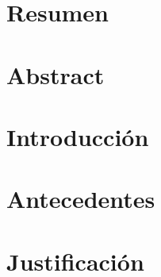 \documentclass[11pt, letterpaper, twoside, openright]{report}
\newcommand{\defaultparformat}[1]{
	{\setlength{\parskip}{2ex}
     }
}
\begin{document}
\ifdefined\CAPresumen
	\newpage
    \cleardoublepage{}
	\chapter*{Resumen}
	\ifdefined\parpordefecto
		\defaultparformat{b-resumen}
	\else
		
	\fi
\fi

\ifdefined\CAPabstract
	\newpage
    \cleardoublepage{}
	\chapter*{Abstract}
	\ifdefined\parpordefecto
		\defaultparformat{c-abstract}
	\else
		
	\fi
\fi

\ifdefined\CAPintroduccion
	\newpage
	\cleardoublepage
	\setcounter{page}{1}
	\chapter{Introducción}
	\ifdefined\parpordefecto
		\defaultparformat{d-introduccion}
	\else
		
	\fi
\fi

\ifdefined\CAPantecedentes
	\newpage
	\chapter{Antecedentes}
	\ifdefined\parpordefecto
    	\defaultparformat{e-antecedentes}
    \else
    	
    \fi  
\fi

\ifdefined\CAPjustificacion
	\newpage
	\chapter{Justificación}
	\ifdefined\parpordefecto
		\defaultparformat{f-justificacion}
	\else
		
	\fi
\fi

\ifdefined\CAPobjetivos
	\newpage
\end{document}
